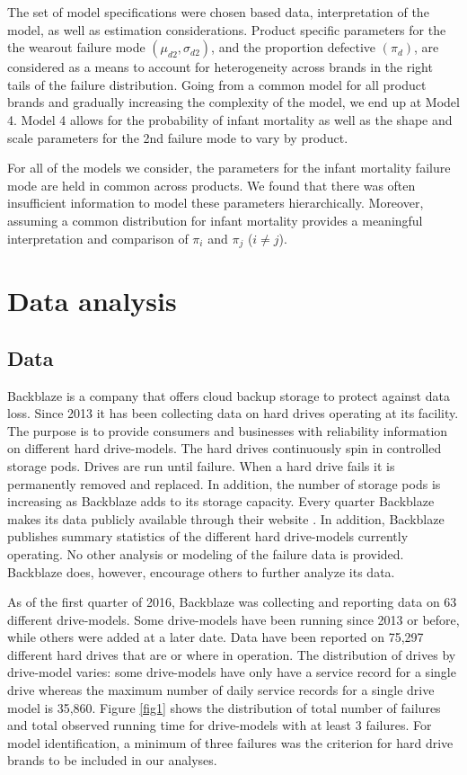\documentclass[12pt]{article}
\begin{document}
The set of model specifications were chosen based data, interpretation of the model, as well as estimation considerations.  Product specific parameters for the the wearout failure mode $(\mu_{d2},\sigma_{d2})$, and the proportion defective $(\pi_d)$, are considered as a means to account for heterogeneity across brands in the right tails of the failure distribution.  Going from a common model for all product brands and gradually increasing the complexity of the model, we end up at Model 4.  Model 4 allows for the probability of infant mortality as well as the shape and scale parameters for the 2nd failure mode to vary by product.

For all of the models we consider, the parameters for the infant mortality failure mode are held in common across products.  We found that there was often insufficient information to model these parameters hierarchically.  Moreover, assuming a common distribution for infant mortality provides a meaningful interpretation and comparison of $\pi_i$ and $\pi_j$ ($i \neq j$). 


\section{Data analysis}
\label{sec:Data analysis}
\subsection{Data}
\label{sec:Data}
Backblaze is a company that offers cloud backup storage to protect against data loss.  Since 2013 it has been collecting data on hard drives operating at its facility.  The purpose is to provide consumers and businesses with reliability information on different hard drive-models.  The hard drives continuously spin in controlled storage pods.  Drives are run until failure.  When a hard drive fails it is permanently removed and replaced.  In addition, the number of storage pods is increasing as Backblaze adds to its storage capacity.  Every quarter Backblaze makes its data publicly available through their website \cite{backblaze}. In addition, Backblaze publishes summary statistics of the different hard drive-models currently operating.  No other analysis or modeling of the failure data is provided.  Backblaze does, however, encourage others to further analyze its data. 

As of the first quarter of 2016, Backblaze was collecting and reporting data on 63 different drive-models.  Some drive-models have been running since 2013 or before, while others were added at a later date.  Data have been reported on 75,297 different hard drives that are or where in operation.  The distribution of drives by drive-model varies: some drive-models have only have a service record for a single drive whereas the maximum number of daily service records for a single drive model is 35,860.  Figure \ref{fig1} shows the distribution of total number of failures and total observed running time for drive-models with at least 3 failures.  For model identification, a minimum of three failures was the criterion for hard drive brands to be included in our analyses.  
\end{document}
